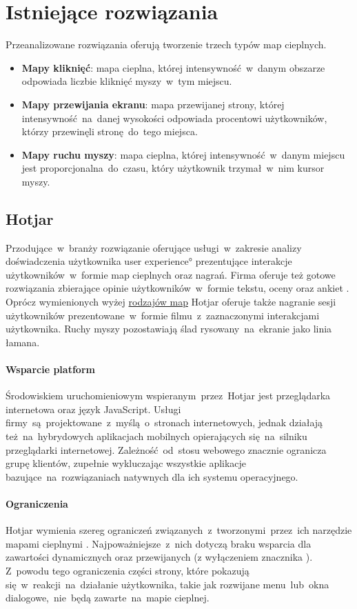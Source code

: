 \section{Istniejące rozwiązania}
\label{par:heat_map_types}

\noindent Przeanalizowane rozwiązania oferują tworzenie trzech typów map cieplnych.

\begin{itemize}
	\item {\bf Mapy kliknięć}: mapa cieplna, której intensywność~w~danym obszarze odpowiada liczbie kliknięć myszy~w~tym miejscu.
	\item {\bf Mapy przewijania ekranu}: mapa przewijanej strony, której intensywność~na~danej wysokości odpowiada procentowi użytkowników, którzy przewinęli stronę~do~tego miejsca.
	\item {\bf Mapy ruchu myszy}: mapa cieplna, której intensywność~w~danym miejscu jest proporcjonalna~do~czasu, który użytkownik trzymał~w~nim kursor myszy.
\end{itemize}

\subsection{Hotjar}
Przodujące~w~branży rozwiązanie oferujące usługi~w~zakresie analizy doświadczenia użytkownika \ang{user experience} prezentujące interakcje użytkowników~w~formie map cieplnych oraz nagrań. Firma oferuje też gotowe rozwiązania zbierające opinie użytkowników~w~formie tekstu, oceny oraz ankiet \cite{Hotjar_website}. Oprócz wymienionych wyżej \hyperref[{par:heat_map_types}]{rodzajów map} Hotjar oferuje także nagranie sesji użytkowników prezentowane~w~formie filmu~z~zaznaczonymi interakcjami użytkownika. Ruchy myszy pozostawiają ślad rysowany~na~ekranie jako linia łamana.

\paragraph{Wsparcie platform} 
Środowiskiem uruchomieniowym wspieranym~przez~Hotjar jest przeglądarka internetowa oraz język JavaScript. Usługi firmy~są~projektowane~z~myślą~o~stronach internetowych, jednak działają też~na~hybrydowych aplikacjach mobilnych opierających się~na~silniku przeglądarki internetowej. Zależność~od~stosu webowego znacznie ogranicza grupę klientów, zupełnie wykluczając wszystkie aplikacje bazujące~na~rozwiązaniach natywnych dla ich systemu operacyjnego.

\paragraph{Ograniczenia} 
Hotjar wymienia szereg ograniczeń związanych~z~tworzonymi~przez~ich narzędzie mapami cieplnymi \cite{Hotjar_limitations}. Najpoważniejsze~z~nich dotyczą braku wsparcia dla zawartości dynamicznych oraz przewijanych (z wyłączeniem znacznika ). Z~powodu tego ograniczenia części strony, które pokazują się~w~reakcji~na~działanie użytkownika, takie jak rozwijane menu~lub~okna dialogowe,~nie~będą zawarte~na~mapie cieplnej.

